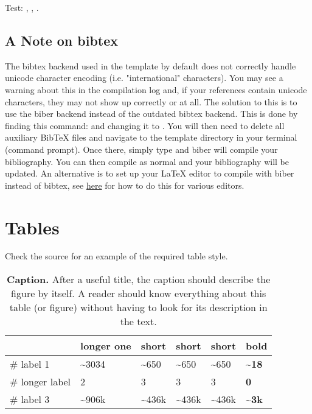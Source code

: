 Test: \citet{oller_analyzing_2020}, \citet{ha2017evolving}, \citet{ha2017visual}.

\subsection{A Note on bibtex}

The bibtex backend used in the template by default does not correctly handle unicode character encoding (i.e. "international" characters). You may see a warning about this in the compilation log and, if your references contain unicode characters, they may not show up correctly or at all. The solution to this is to use the biber backend instead of the outdated bibtex backend. This is done by finding this command:  and changing it to . You will then need to delete all auxiliary BibTeX files and navigate to the template directory in your terminal (command prompt). Once there, simply type  and biber will compile your bibliography. You can then compile  as normal and your bibliography will be updated. An alternative is to set up your LaTeX editor to compile with biber instead of bibtex, see \href{http://tex.stackexchange.com/questions/154751/biblatex-with-biber-configuring-my-editor-to-avoid-undefined-citations/}{here} for how to do this for various editors.

\section{Tables}

Check the source for an example of the required table style.

\begin{table}[h!] %
\caption[Example]{%
  \textbf{Caption.}
  After a useful title, the caption should describe the figure by itself. A reader should know everything about this table (or figure) without having to look for its description in the text.
}
\label{tab:example}
\center
\begin{tabular}{m{25mm}lllll}
  \toprule
  & longer one & short & short & short & \textbf{bold} \\
  \midrule
  \# label 1       & {\textasciitilde{}}3034 & {\textasciitilde{}}650 & {\textasciitilde{}}650  & {\textasciitilde{}}650  & \textbf{{\textasciitilde{}}18} \\
  \# longer label & 2 & 3 & 3 & 3 & \textbf{0} \\
  \# label 3   & {\textasciitilde{}}906k & {\textasciitilde{}}436k & {\textasciitilde{}}436k & {\textasciitilde{}}436k & \textbf{{\textasciitilde{}}}\textbf{3k}\\
  \bottomrule
  \end{tabular}
\end{table}

